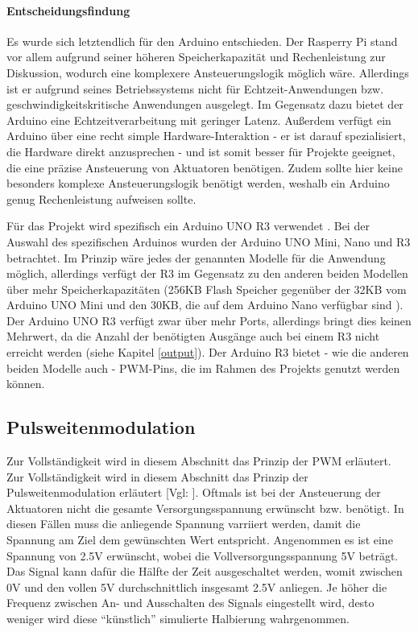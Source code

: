 \paragraph{Entscheidungsfindung}
Es wurde sich letztendlich für den Arduino entschieden.
Der Rasperry Pi stand vor allem aufgrund seiner höheren Speicherkapazität und Rechenleistung zur Diskussion, wodurch eine komplexere Ansteuerungslogik möglich wäre.
Allerdings ist er aufgrund seines Betriebssystems nicht für Echtzeit-Anwendungen bzw. geschwindigkeitskritische Anwendungen ausgelegt.
Im Gegensatz dazu bietet der Arduino eine Echtzeitverarbeitung mit geringer Latenz.
Außerdem verfügt ein Arduino über eine recht simple Hardware-Interaktion - er ist darauf spezialisiert, die Hardware direkt anzusprechen - und ist somit besser für Projekte geeignet, die eine präzise Ansteuerung von Aktuatoren benötigen. %
Zudem sollte hier keine besonders komplexe Ansteuerungslogik benötigt werden, weshalb ein Arduino genug Rechenleistung aufweisen sollte.

Für das Projekt wird spezifisch ein Arduino UNO R3 verwendet \cite[siehe][für die genaue Spezifikation]{ard.ArduinoR3Datasheet.24}.
Bei der Auswahl des spezifischen Arduinos wurden der Arduino UNO Mini, Nano und R3 betrachtet.
Im Prinzip wäre jedes der genannten Modelle für die Anwendung möglich, allerdings verfügt der R3 im Gegensatz zu den anderen beiden Modellen über mehr Speicherkapazitäten (256KB Flash Speicher
gegenüber der 32KB vom Arduino UNO Mini und den 30KB, die auf dem Arduino Nano verfügbar sind \cites[vgl.][]{ard.ArduinoR3Datasheet.24}{ard.ArduinoMiniDatasheet.24}{ard.ArduinoNanoDatasheet.24}).
Der Arduino UNO R3 verfügt zwar über mehr Ports, allerdings bringt dies keinen Mehrwert, da die Anzahl der benötigten Ausgänge auch bei einem R3 nicht erreicht werden
(siehe Kapitel \ref{output}).
Der Arduino R3 bietet - wie die anderen beiden Modelle auch - \ac{PWM}-Pins, die im Rahmen des Projekts genutzt werden können.


\subsection{Pulsweitenmodulation}\label{PWM}

Zur Vollständigkeit wird in diesem Abschnitt das Prinzip der \acf{PWM} erläutert.
Zur Vollständigkeit wird in diesem Abschnitt das Prinzip der Pulsweitenmodulation erläutert [Vgl: \cite*[siehe ][]{PWM}].
Oftmals ist bei der Ansteuerung der Aktuatoren nicht die gesamte Versorgungsspannung erwünscht bzw. benötigt.
In diesen Fällen muss die anliegende Spannung varriiert werden, damit die Spannung am Ziel dem gewünschten Wert entspricht.
Angenommen es ist eine Spannung von 2.5V erwünscht, wobei die Vollversorgungsspannung 5V beträgt.
Das Signal kann dafür die Hälfte der Zeit ausgeschaltet werden, womit zwischen 0V und den vollen 5V durchschnittlich insgesamt 2.5V anliegen.
Je höher die Frequenz zwischen An- und Ausschalten des Signals eingestellt wird, desto weniger wird diese \enquote{künstlich} simulierte Halbierung wahrgenommen.

